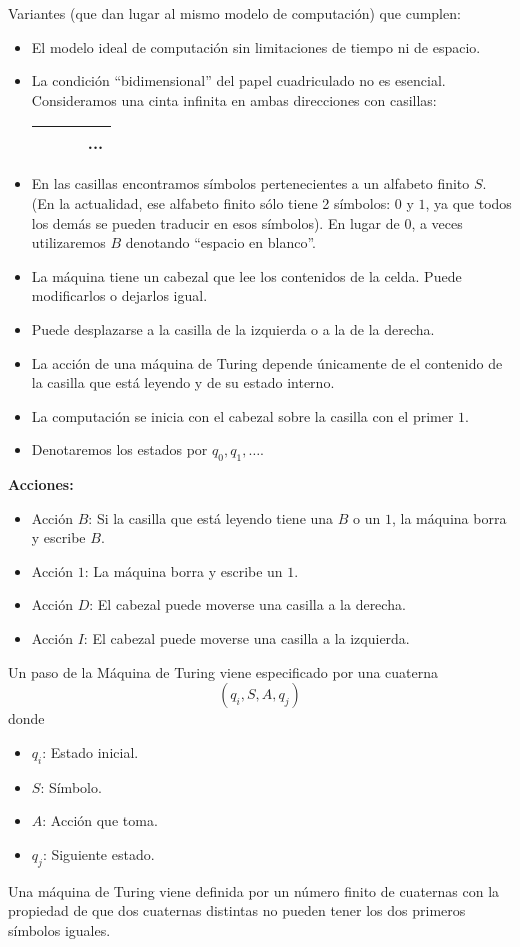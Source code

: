 \begin{defn}
Variantes (que dan lugar al mismo modelo de computación) que cumplen:

\begin{itemize}
	\item El modelo ideal de computación sin limitaciones de tiempo ni de espacio.
	\item La condición ``bidimensional'' del papel cuadriculado no es esencial. Consideramos una cinta infinita en ambas direcciones con casillas:
	\begin{center}
	\begin{tabular}{|c|c|c|c|}
	\hline
	&&&...\\
	\hline
	\end{tabular}
	\end{center}
	\item En las casillas encontramos símbolos pertenecientes a un alfabeto finito $S$. (En la actualidad, ese alfabeto finito sólo tiene 2 símbolos: $0$ y $1$, ya que todos los demás se pueden traducir en esos símbolos). En lugar de $0$, a veces utilizaremos $B$ denotando ``espacio en blanco''.
	\item La máquina tiene un cabezal que lee los contenidos de la celda. Puede modificarlos o dejarlos igual.
	\item Puede desplazarse a la casilla de la izquierda o a la de la derecha.
	\item La acción de una máquina de Turing depende únicamente de el contenido de la casilla que está leyendo y de su estado interno.
	\item La computación se inicia con el cabezal sobre la casilla con el primer $1$.
	\item Denotaremos los estados por $q_0, q_1, \hdots$.
\end{itemize}

\textbf{Acciones:}
\begin{itemize}
	\item Acción $B$: Si la casilla que está leyendo tiene una $B$ o un $1$, la máquina borra y escribe $B$.
	\item Acción $1$: La máquina borra y escribe un $1$.
	\item Acción $D$: El cabezal puede moverse una casilla a la derecha.
	\item Acción $I$: El cabezal puede moverse una casilla a la izquierda.
\end{itemize}

Un paso de la Máquina de Turing viene especificado por una cuaterna
$$\left(q_i, S, A, q_j\right)$$
donde
\begin{itemize}
	\item $q_i$: Estado inicial.
	\item $S$: Símbolo.
	\item $A$: Acción que toma.
	\item $q_j$: Siguiente estado.
\end{itemize}

Una máquina de Turing viene definida por un número finito de cuaternas con la propiedad de que dos cuaternas distintas no pueden tener los dos primeros símbolos iguales.
\end{defn}

